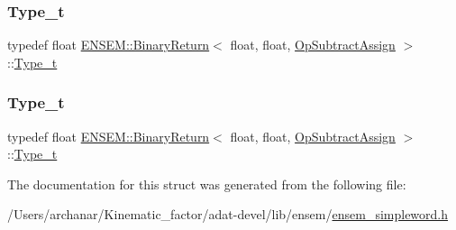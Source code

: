 \mbox{\label{structENSEM_1_1BinaryReturn_3_01float_00_01float_00_01OpSubtractAssign_01_4_a0b38c0b93f84d57852605cf3a65412e8}} 
\subsubsection{\texorpdfstring{Type\_t}{Type\_t}\hspace{0.1cm}{\footnotesize\ttfamily [2/3]}}
{\footnotesize\ttfamily typedef float \mbox{\hyperlink{structENSEM_1_1BinaryReturn}{E\+N\+S\+E\+M\+::\+Binary\+Return}}$<$ float, float, \mbox{\hyperlink{structENSEM_1_1OpSubtractAssign}{Op\+Subtract\+Assign}} $>$\+::\mbox{\hyperlink{structENSEM_1_1BinaryReturn_3_01float_00_01float_00_01OpSubtractAssign_01_4_a0b38c0b93f84d57852605cf3a65412e8}{Type\+\_\+t}}}

\mbox{\label{structENSEM_1_1BinaryReturn_3_01float_00_01float_00_01OpSubtractAssign_01_4_a0b38c0b93f84d57852605cf3a65412e8}} 
\subsubsection{\texorpdfstring{Type\_t}{Type\_t}\hspace{0.1cm}{\footnotesize\ttfamily [3/3]}}
{\footnotesize\ttfamily typedef float \mbox{\hyperlink{structENSEM_1_1BinaryReturn}{E\+N\+S\+E\+M\+::\+Binary\+Return}}$<$ float, float, \mbox{\hyperlink{structENSEM_1_1OpSubtractAssign}{Op\+Subtract\+Assign}} $>$\+::\mbox{\hyperlink{structENSEM_1_1BinaryReturn_3_01float_00_01float_00_01OpSubtractAssign_01_4_a0b38c0b93f84d57852605cf3a65412e8}{Type\+\_\+t}}}



The documentation for this struct was generated from the following file\+:\begin{DoxyCompactItemize}
\item 
/\+Users/archanar/\+Kinematic\+\_\+factor/adat-\/devel/lib/ensem/\mbox{\hyperlink{adat-devel_2lib_2ensem_2ensem__simpleword_8h}{ensem\+\_\+simpleword.\+h}}\end{DoxyCompactItemize}

